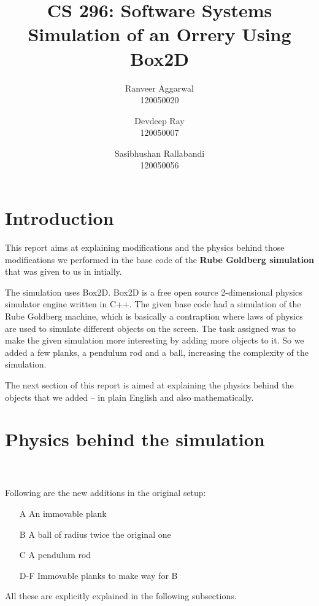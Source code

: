 \documentclass[11pt]{article}
\title{CS 296: Software Systems \\ Simulation of an Orrery Using Box2D}
\author{Ranveer Aggarwal \\ 120050020 \and Devdeep Ray \\ 120050007 \and Sasibhushan Rallabandi \\ 120050056}
\begin{document}
\maketitle

\section{Introduction}
This report aims at explaining modifications and the physics behind those modifications we performed in the base code of the \textbf{Rube Goldberg simulation} that was given to us in intially.

The simulation uses Box2D. Box2D is a free open source 2-dimensional physics simulator engine written in C++. The given base code had a simulation of the Rube Goldberg machine, which is basically a contraption where laws of physics are used to simulate different objects on the screen. The task assigned was to make the given simulation more interesting by adding more objects to it. So we added a few planks, a pendulum rod and a ball, increasing the complexity of the simulation.

The next section of this report is aimed at explaining the physics behind the objects that we added -- in plain English and also mathematically.
\pagebreak

\section{Physics behind the simulation}

\setlength\fboxsep{2pt}
\setlength\fboxrule{1pt}
\\
\\
Following are the new additions in the original setup:
\begin{itemize}
\item[A] An immovable plank
\item[B] A ball of radius twice the original one
\item[C] A pendulum rod
\item[D-F] Immovable planks to make way for B
\end{itemize}
All these are explicitly explained in the following subsections.
\end{document}
